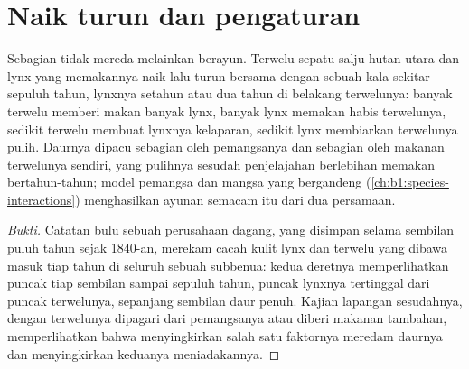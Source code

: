 \section{Naik turun dan pengaturan}

\begin{proposition}\label{prop:b1:populations:cycles}
Sebagian  tidak mereda melainkan berayun. Terwelu sepatu salju
hutan utara dan lynx yang memakannya naik lalu turun bersama dengan
sebuah kala sekitar sepuluh tahun, lynxnya setahun atau dua tahun di
belakang terwelunya: banyak terwelu memberi makan banyak lynx,
banyak lynx memakan habis terwelunya, sedikit terwelu membuat
lynxnya kelaparan, sedikit lynx membiarkan terwelunya pulih. Daurnya dipacu
sebagian oleh pemangsanya dan sebagian oleh makanan terwelunya
sendiri, yang pulihnya sesudah penjelajahan berlebihan memakan
bertahun-tahun; model pemangsa dan mangsa yang bergandeng
(\cref{ch:b1:species-interactions}) menghasilkan ayunan semacam itu
dari dua persamaan.
\end{proposition}
\begin{proof}[Bukti]
Catatan bulu sebuah perusahaan dagang, yang disimpan selama sembilan
puluh tahun sejak 1840-an, merekam cacah kulit lynx dan terwelu yang
dibawa masuk tiap tahun di seluruh sebuah subbenua: kedua deretnya
memperlihatkan puncak tiap sembilan sampai sepuluh tahun, puncak
lynxnya tertinggal dari puncak terwelunya, sepanjang sembilan daur
penuh. Kajian lapangan sesudahnya, dengan terwelunya dipagari dari
pemangsanya atau diberi makanan tambahan, memperlihatkan bahwa
menyingkirkan salah satu faktornya meredam daurnya dan menyingkirkan
keduanya meniadakannya.
\end{proof}


